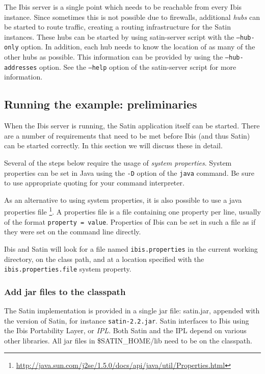 \documentclass[a4paper,10pt]{article}
\begin{document}
The Ibis server is a single point which needs to be reachable from every
Ibis instance. Since sometimes this is not possible due to firewalls,
additional \emph{hubs} can be started to route traffic, creating a
routing infrastructure for the Satin instances. These hubs can be started
by using satin-server script with the \texttt{--hub-only} option. In
addition, each hub needs to know the location of as many of the other
hubs as possible. This information can be provided by using the
\texttt{--hub-addresses} option. See the \texttt{--help} option of the
satin-server script for more information.

\subsection{Running the example: preliminaries}

When the Ibis server is running, the Satin application itself can be
started.  There are a number of requirements that need to be met before
Ibis (and thus Satin) can be started correctly.
In this section we will discuss these in detail.

Several of the steps below require the usage of \emph{system properties}.
System properties can be set in Java using the \texttt{-D} option of the
\texttt{java} command. Be sure to use appropriate quoting for your
command interpreter.

As an alternative to using system properties, it is also possible to use
a java properties file
\footnote{\url{http://java.sun.com/j2se/1.5.0/docs/api/java/util/Properties.html}}.
A properties file is a file containing one property per line, usually of
the format \texttt{property = value}. Properties of Ibis can be set in
such a file as if they were set on the command line directly.

Ibis and Satin will look for a file named \texttt{ibis.properties} in the
current working directory, on the class path, and at a location specified
with the \texttt{ibis.properties.file} system property.

\subsubsection{Add jar files to the classpath}

The Satin implementation is provided in a single jar file: satin.jar,
appended with the version of Satin, for instance \texttt{satin-2.2.jar}.
Satin interfaces to Ibis using the Ibis Portability Layer, or
\emph{IPL}. Both Satin and the IPL depend on various other libraries.
All jar files in \$SATIN\_HOME/lib need to be on the classpath.
\end{document}
